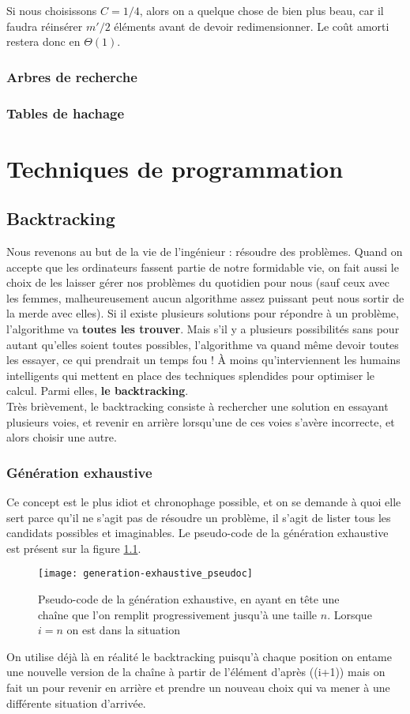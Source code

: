 \documentclass[12pt,a4paper]{book}
\newcommand{\pseudo}[1]{\rouge{\textsc{#1}}}
\begin{document}
Si nous choisissons $C = 1/4$, alors on a quelque chose de bien plus beau, car il faudra réinsérer $m'/2$ éléments avant de devoir redimensionner. Le coût amorti restera donc en $\Theta(1)$.

\section{Arbres de recherche}
\section{Tables de hachage}

\part{Techniques de programmation}
\chapter{Backtracking}
Nous revenons au but de la vie de l'ingénieur : résoudre des problèmes. Quand on accepte que les ordinateurs fassent partie de notre formidable vie, on fait aussi le choix de les laisser gérer nos problèmes du quotidien pour nous (sauf ceux avec les femmes, malheureusement aucun algorithme assez puissant peut nous sortir de la merde avec elles). Si il existe plusieurs solutions pour répondre à un problème, l'algorithme va \textbf{toutes les trouver}. Mais s'il y a plusieurs possibilités sans pour autant qu'elles soient toutes possibles, l'algorithme va quand même devoir toutes les essayer, ce qui prendrait un temps fou ! À moins qu'interviennent les humains intelligents qui mettent en place des techniques splendides pour optimiser le calcul. Parmi elles, \textbf{le backtracking}. \\

Très brièvement, le backtracking consiste à rechercher une solution en essayant plusieurs voies, et revenir en arrière lorsqu'une de ces voies s'avère incorrecte, et alors choisir une autre.
\section{Génération exhaustive}
Ce concept est le plus idiot et chronophage possible, et on se demande à quoi elle sert parce qu'il ne s'agit pas de résoudre un problème, il s'agit de lister tous les candidats possibles et imaginables. Le pseudo-code de la génération exhaustive est présent sur la figure \ref{fig:generation-exhaustive_pseudoc}.
\begin{figure}[h]
\centering
\texttt{[image: generation-exhaustive\_pseudoc]}
\caption{Pseudo-code de la génération exhaustive, en ayant en tête une chaîne que l'on remplit progressivement jusqu'à une taille $n$. Lorsque $i=n$ on est dans la situation \pseudo{Finished}}
\label{fig:generation-exhaustive_pseudoc}
\end{figure}
On utilise déjà là en réalité le backtracking puisqu'à chaque position on entame une nouvelle version de la chaîne à partir de l'élément d'après (\pseudo{Generate}(i+1)) mais on fait un \pseudo{Undo} pour revenir en arrière et prendre un nouveau choix qui va mener à une différente situation d'arrivée.
\end{document}
